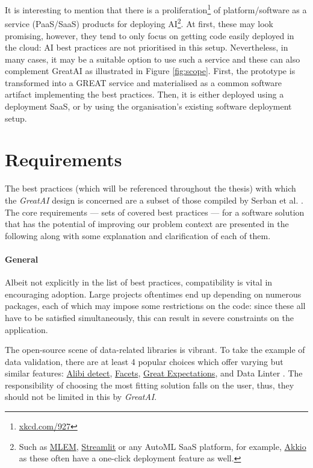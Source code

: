 It is interesting to mention that there is a proliferation\footnote{\href{https://xkcd.com/927/}{xkcd.com/927}} of platform/software as a service (PaaS/SaaS) products for deploying AI\footnote{Such as \href{https://mlem.ai/}{MLEM}, \href{https://streamlit.io/cloud}{Streamlit} or any AutoML SaaS platform, for example, \href{https://www.akkio.com/role/software-engineers}{Akkio} as these often have a one-click deployment feature as well.}. At first, these may look promising, however, they tend to only focus on getting code easily deployed in the cloud: AI best practices are not prioritised in this setup. Nevertheless, in many cases, it may be a suitable option to use such a service and these can also complement GreatAI as illustrated in Figure \ref{fig:scope}. First, the prototype is transformed into a GREAT service and materialised as a common software artifact implementing the best practices. Then, it is either deployed using a deployment SaaS, or by using the organisation's existing software deployment setup.

\section{Requirements} \label{section:requirements}

The best practices (which will be referenced throughout the thesis) with which the \textit{GreatAI} design is concerned are a subset of those compiled by Serban et al. \cite{serban2020adoption}. The core requirements --- sets of covered best practices --- for a software solution that has the potential of improving our problem context are presented in the following along with some explanation and clarification of each of them.

\paragraph{General} Albeit not explicitly in the list of best practices, compatibility is vital in encouraging adoption. Large projects oftentimes end up depending on numerous packages, each of which may impose some restrictions on the code: since these all have to be satisfied simultaneously, this can result in severe constraints on the application. 

The open-source scene of data-related libraries is vibrant. To take the example of data validation, there are at least 4 popular choices which offer varying but similar features: \href{https://github.com/SeldonIO/alibi-detect}{Alibi detect}, \href{https://github.com/PAIR-code/facets}{Facets}, \href{https://github.com/great-expectations/great_expectations}{Great Expectations}, and Data Linter \cite{hynes2017data}. The responsibility of choosing the most fitting solution falls on the user, thus, they should not be limited in this by \textit{GreatAI}.

